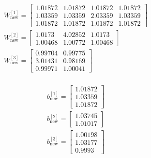 \documentclass{article}
\begin{document}
\setlength{\columnseprule}{0pt}
\begin{multicols}{2}

\begin{center}
    \begin{align*}
        &W^{[1]}_{\text{new}} = \begin{bmatrix} 1.01872 & 1.01872 & 1.01872 & 1.01872 \\  1.03359 & 1.03359 & 2.03359 & 1.03359 \\  1.01872 & 1.01872 & 1.01872 & 1.01872\end{bmatrix} \\
        &W^{[2]}_{\text{new}} = \begin{bmatrix} 1.0173  & 4.02852 & 1.0173  \\  1.00468 & 1.00772 & 1.00468  \end{bmatrix} \\
        &W^{[3]}_{\text{new}} = \begin{bmatrix} 0.99704 & 0.99775 \\  3.01431 & 0.98169 \\  0.99971 & 1.00041  \end{bmatrix} \\
    \end{align*}
\end{center}


\columnbreak

\begin{center}
    \begin{align*}
        &b^{[1]}_{\text{new}} = \begin{bmatrix} 1.01872 \\  1.03359 \\  1.01872\end{bmatrix} \\
        &b^{[2]}_{\text{new}} = \begin{bmatrix} 1.03745 \\  1.01017\end{bmatrix} \\
        &b^{[3]}_{\text{new}} = \begin{bmatrix} 1.00198 \\  1.03177 \\  0.9993 \end{bmatrix} \\
    \end{align*}
\end{center}


\end{multicols}
\end{document}
